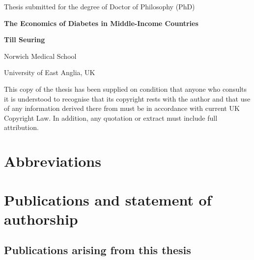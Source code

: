 


%
\date{\today}
\makeatletter
\begin{titlepage}
\centering
\vfill
Thesis submitted for the degree of Doctor of Philosophy (PhD)
\par
\vspace*{1in}
\begin{Large}\bfseries
The Economics of Diabetes in Middle-Income Countries\par
\end{Large}
\vspace{1in}
\begin{large}\bfseries
Till Seuring\par
\end{large}
\par
\vspace{0.2in}
Norwich Medical School
\par
University of East Anglia, UK
\par
\vspace{1.0in}
\@date
\par
\vspace{2.0in}
This copy of the thesis has been supplied on condition that anyone who consults it is
understood to recognise that its copyright rests with the author and that use of any
information derived there from must be in accordance with current UK Copyright Law.
In addition, any quotation or extract must include full attribution.
\end{titlepage}
\makeatother
\begin{abstract}

\end{abstract}

\tableofcontents
\clearpage

\listoffigures
\clearpage
 
\listoftables
\clearpage

\chapter*{Abbreviations}

\acresetall  %
\chapter*{\label{publication_statement}Publications and statement of authorship}
\section*{Publications arising from this thesis}

